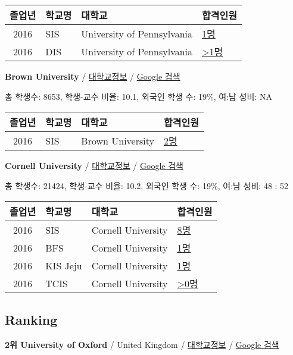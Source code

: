 \documentclass[13pt,]{article}
\begin{document}
\begin{longtable}[]{@{}clll@{}}
\toprule
졸업년 & 학교명 & 대학교 & 합격인원\tabularnewline
\midrule
\endhead
2016 & SIS & University of Pennsylvania &
\href{http://cafe.naver.com/assarabia/11589}{1명}\tabularnewline
2016 & DIS & University of Pennsylvania &
\href{http://cafe.naver.com/assarabia/11591}{\textgreater{}1명}\tabularnewline
\bottomrule
\end{longtable}

\textbf{Brown University} /
\href{https://www.timeshighereducation.com/world-university-rankings/brown-university?ranking-dataset=133819}{대학교정보}
/ \href{http://www.google.com/search?q=Brown+University}{Google 검색}

총 학생수: 8653, 학생-교수 비율: 10.1, 외국인 학생 수: 19\%, 여:남 성비:
NA

\begin{longtable}[]{@{}clll@{}}
\toprule
졸업년 & 학교명 & 대학교 & 합격인원\tabularnewline
\midrule
\endhead
2016 & SIS & Brown University &
\href{http://cafe.naver.com/assarabia/11589}{2명}\tabularnewline
\bottomrule
\end{longtable}

\textbf{Cornell University} /
\href{https://www.timeshighereducation.com/world-university-rankings/cornell-university?ranking-dataset=133819}{대학교정보}
/ \href{http://www.google.com/search?q=Cornell+University}{Google 검색}

총 학생수: 21424, 학생-교수 비율: 10.2, 외국인 학생 수: 19\%, 여:남
성비: 48 : 52

\begin{longtable}[]{@{}clll@{}}
\toprule
졸업년 & 학교명 & 대학교 & 합격인원\tabularnewline
\midrule
\endhead
2016 & SIS & Cornell University &
\href{http://cafe.naver.com/assarabia/11589}{8명}\tabularnewline
2016 & BFS & Cornell University &
\href{http://cafe.naver.com/assarabia/11597}{1명}\tabularnewline
2016 & KIS Jeju & Cornell University &
\href{http://cafe.naver.com/assarabia/11596}{1명}\tabularnewline
2016 & TCIS & Cornell University &
\href{http://cafe.naver.com/assarabia/11598}{\textgreater{}0명}\tabularnewline
\bottomrule
\end{longtable}

\subsection{Ranking}\label{ranking}

\textbf{2위 University of Oxford} / United Kingdom /
\href{https://www.timeshighereducation.com/world-university-rankings/university-of-oxford?ranking-dataset=133819}{대학교정보}
/ \href{http://www.google.com/search?q=University+of+Oxford}{Google
검색}
\end{document}

